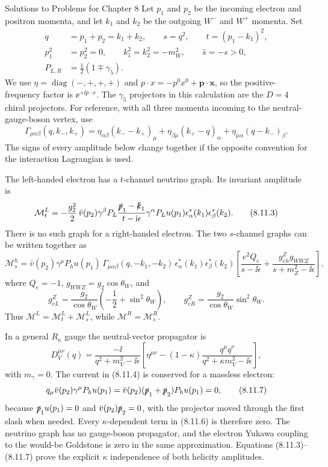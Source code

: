 \begin{bankssolutions}{Solutions to Problems for Chapter 8}
Let $p_1$ and $p_2$ be the incoming electron and positron momenta, and let
$k_1$ and $k_2$ be the outgoing $W^-$ and $W^+$ momenta.  Set
\[
\begin{aligned}
  q&=p_1+p_2=k_1+k_2,\qquad s=q^2,\qquad t=(p_1-k_1)^2,\\
  p_1^2&=p_2^2=0,\qquad k_1^2=k_2^2=-m_W^2,\qquad \widehat s=-s>0,\\
  P_{L,R}&=\frac12(1\mp\gamma_5).
\end{aligned}
\tag{8.11.1}
\]
We use $\eta=\operatorname{diag}(-,+,+,+)$ and
$p\cdot x=-p^0x^0+\mathbf p\cdot\mathbf x$, so the positive-frequency
factor is $\ee^{+\ii p\cdot x}$.  The $\gamma_5$ projectors in this
calculation are the $D=4$ chiral projectors.
For reference, with all three momenta incoming to the neutral-gauge-boson
vertex, use
\[
  \Gamma_{\mu\alpha\beta}(q,k_-,k_+)
  =\eta_{\alpha\beta}(k_--k_+)_\mu
   +\eta_{\beta\mu}(k_+-q)_\alpha
   +\eta_{\mu\alpha}(q-k_-)_\beta .
  \tag{8.11.2}
\]
The signs of every amplitude below change together if the opposite convention
for the interaction Lagrangian is used.

The left-handed electron has a $t$-channel neutrino graph.  Its invariant
amplitude is
\[
  \mathcal M_t^L
  =-\frac{g_2^2}{2}\,
  \bar v(p_2)\gamma^\beta P_L
  \frac{\slashed p_1-\slashed k_1}{t-\mathrm{i}\epsilon}
  \gamma^\alpha P_Lu(p_1)
  \epsilon^*_{\alpha}(k_1)\epsilon^*_{\beta}(k_2).
  \tag{8.11.3}
\]
There is no such graph for a right-handed electron.  The two $s$-channel
graphs can be written together as
\[
  \mathcal M_s^h
  =\bar v(p_2)\gamma^\mu P_hu(p_1)
  \,\Gamma_{\mu\alpha\beta}(q,-k_1,-k_2)
  \,\epsilon^*_{\alpha}(k_1)\epsilon^*_{\beta}(k_2)
  \left[\frac{e^2Q_e}{s-\ii\epsilon}
  +\frac{g_{eh}^Zg_{WWZ}}{s+m_Z^2-\ii\epsilon}\right],
  \tag{8.11.4}
\]
where $Q_e=-1$, $g_{WWZ}=g_2\cos\theta_W$, and
\[
  g_{eL}^Z=\frac{g_2}{\cos\theta_W}
  \left(-\frac12+\sin^2\theta_W\right),
  \qquad
  g_{eR}^Z=\frac{g_2}{\cos\theta_W}\sin^2\theta_W .
  \tag{8.11.5}
\]
Thus $\mathcal M^L=\mathcal M_t^L+\mathcal M_s^L$, while
$\mathcal M^R=\mathcal M_s^R$.

In a general $R_\kappa$ gauge the neutral-vector propagator is
\[
  D_V^{\mu\nu}(q)=\frac{-\ii}{q^2+m_V^2-\ii\epsilon}
  \left[\eta^{\mu\nu}-(1-\kappa)
  \frac{q^\mu q^\nu}{q^2+\kappa m_V^2-\ii\epsilon}\right],
  \tag{8.11.6}
\]
with $m_\gamma=0$.  The current in (8.11.4) is conserved for a massless
electron:
\[
  q_\mu\bar v(p_2)\gamma^\mu P_hu(p_1)
  =\bar v(p_2)(\slashed p_1+\slashed p_2)P_hu(p_1)=0,
  \tag{8.11.7}
\]
because $\slashed p_1u(p_1)=0$ and $\bar v(p_2)\slashed p_2=0$, with the
projector moved through the first slash when needed.  Every $\kappa$-dependent
term in (8.11.6) is therefore zero.  The neutrino graph has no gauge-boson
propagator, and the electron Yukawa coupling to the would-be Goldstone is zero
in the same approximation.  Equations (8.11.3)--(8.11.7) prove the explicit
$\kappa$ independence of both helicity amplitudes.


\end{bankssolutions}
